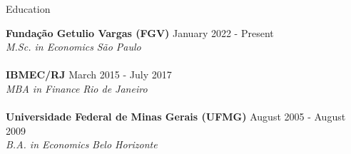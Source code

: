 \documentclass{resume}
\begin{document}
  \begin{rSection}{Education}

    {\bf Fundação Getulio Vargas (FGV)} \hfill { January 2022 - Present} \\ 
    {\em M.Sc. in Economics } \hfill {\em São Paulo} \\
    { } \\
    {\bf IBMEC/RJ} \hfill { March 2015 - July 2017} \\
    {\em MBA in Finance } \hfill {\em Rio de Janeiro} \\
    { } \\
    {\bf Universidade Federal de Minas Gerais (UFMG)}
    \hfill { August 2005 - August 2009} \\
    {\em B.A. in Economics } \hfill {\em Belo Horizonte} \\
  \end{rSection}
  
\end{document}
